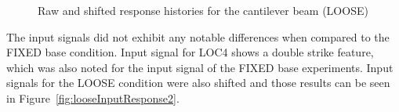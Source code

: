 \documentclass[paper=a4, fontsize=12pt]{scrartcl} %
\begin{document}
	\begin{figure}[H]
		\centering
		\quad
		\caption{Raw and shifted response histories for the cantilever beam (LOOSE)}
		\label{fig:looseTimeResponse}
	\end{figure}
%
The input signals did not exhibit any notable differences when compared to the FIXED base condition. Input signal for LOC4 shows a double strike feature, which was also noted for the input signal of the FIXED base experiments. Input signals for the LOOSE condition were also shifted and those results can be seen in Figure~\ref{fig:looseInputResponse2}.
%
\end{document}
